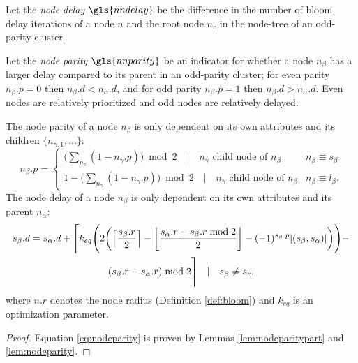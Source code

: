 \begin{definition}\label{def:nodedelay}
  Let the \emph{node delay} $\gls{nndelay}$ be the difference in the number of bloom delay iterations of a node $n$ and the root node $n_r$ in the node-tree of an odd-parity cluster.
\end{definition}

\begin{definition}\label{def:nodeparity}
  Let the \emph{node parity} $\gls{nnparity}$ be an indicator for whether a node $n_\beta$ has a larger delay compared to its parent in an odd-parity cluster; for even parity $n_\beta.p=0$ then $n_\beta.d < n_\alpha.d$, and for odd parity $n_\beta.p=1$ then $n_\beta.d > n_\alpha.d$. Even nodes are relatively prioritized and odd nodes are relatively delayed.
\end{definition}

\begin{theorem}\label{the:delayequation}
  The node parity of a node $n_\beta$ is only dependent on its own attributes and its children $\{n_{\gamma,1}, ...\}$:
  \begin{equation}\label{eq:nodeparity}
    n_\beta.p =
    \begin{cases}
      \big( \sum_{n_\gamma} (1-n_\gamma.p) \big ) \bmod 2 \hspace{1em} | \hspace{1em} n_\gamma \text{ child node of } n_\beta & n_\beta \equiv s_\beta \\
      1 - \big( \sum_{n_\gamma} (1-n_\gamma.p) \big ) \bmod 2 \hspace{1em} | \hspace{1em} n_\gamma \text{ child node of } n_\beta & n_\beta \equiv l_\beta.
    \end{cases} 
  \end{equation}
  The node delay of a node $n_\beta$ is only dependent on its own attributes and its parent $n_\alpha$:
  \begin{multline}\label{eq:delayequation}
    s_\beta.d = s_\alpha.d + \Bigg \lceil k_{eq} \Bigg( 2\bigg({\left \lceil \frac{s_\beta.r}{2} \right \rceil } - {\left \lfloor \frac{s_\alpha.r + s_\beta.r \bmod 2}{2} \right \rfloor } - (-1)^{s_\beta.p}\abs{(s_\beta,s_\alpha)}\bigg)
    \Bigg) - \\
    (s_\beta.r - s_\alpha.r) \bmod 2 \Bigg \rceil \hspace{1em} | \hspace{1em} s_\beta \neq s_r.
  \end{multline}
  where $n.r$ denotes the node radius (Definition \ref{def:bloom}) and $k_{eq}$ is an optimization parameter.
\end{theorem}
\begin{proof}
  Equation \ref{eq:nodeparity} is proven by Lemmas \ref{lem:nodeparitypart} and \ref{lem:nodeparity}. 
\end{proof}

